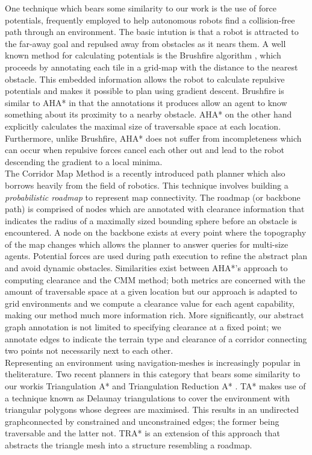 \documentclass[letterpaper]{article}
\begin{document}
One technique which bears some similarity to our work is the use of force potentials, frequently employed to help autonomous robots find a collision-free path through an environment. The basic intution is that a robot is attracted to the far-away goal and repulsed away from obstacles as it nears them. A well known method for calculating potentials is the Brushfire algorithm \cite{latombe91}, which proceeds by annotating each tile in a grid-map with the distance to the nearest obstacle. This embedded information allows the robot to calculate repulsive potentials and makes it possible to plan using gradient descent. \newline
Brushfire is similar to AHA* in that the annotations it produces allow an agent to know something about its proximity to a nearby obstacle. AHA* on the other hand explicitly calculates the maximal size of traversable space at each location. Furthermore, unlike Brushfire, AHA* does not suffer from incompleteness which can occur when repulsive forces cancel each other out and lead to the robot descending the gradient to a local minima.\\ \newline
The Corridor Map Method \cite{geraerts07} is a recently introduced path planner which also borrows heavily from the field of robotics. This technique involves building a \emph{probabilistic roadmap} to represent map connectivity. The roadmap (or backbone path) is comprised of nodes which are annotated with clearance information that indicates the radius of a maximally sized bounding sphere before an obstacle is encountered. A node on the backbone exists at every point where the topography of the map changes which allows the planner to answer queries for multi-size agents. Potential forces are used during path execution to refine the abstract plan and avoid dynamic obstacles. \newline
Similarities exist between AHA*'s approach to computing clearance and the CMM  method; both metrics are concerned with the amount of traversable space at a given location but our approach is adapted to grid environments and we compute a clearance value for each agent capability, making our method much more information rich. More significantly, our abstract graph annotation is not limited to specifying clearance at a fixed point; we annotate edges to indicate the terrain type and clearance of a corridor connecting two points not necessarily next to each other. \\ \newline
Representing an environment using navigation-meshes is increasingly popular in theliterature. Two recent planners in this category that bears some similarity to our workis Triangulation A* and Triangulation Reduction A* \cite{demyen07}. TA* makes use of a technique known as Delaunay triangulations to cover the environment with triangular polygons whose degrees are maximised. This results in an undirected graphconnected by constrained and unconstrained edges; the former being traversable and the latter not. TRA* is an extension of this approach that abstracts the triangle mesh into a structure resembling a roadmap. 
\end{document}
